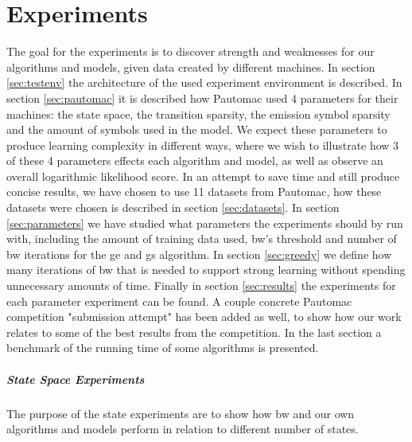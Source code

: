 \chapter{Experiments}
\label{chap:experiments}
The goal for the experiments is to discover strength and weaknesses for our algorithms and models, given data created by different machines. In section \ref{sec:testenv} the architecture of the used experiment environment is described. In section \ref{sec:pautomac} it is described how Pautomac used 4 parameters for their machines: the state space, the transition sparsity, the emission symbol sparsity and the amount of symbols used in the model. We expect these parameters to produce learning complexity in different ways, where we wish to illustrate how 3 of these 4 parameters effects each algorithm and model, as well as observe an overall logarithmic likelihood score. In an attempt to save time and still produce concise results, we have chosen to use 11 datasets from Pautomac, how these datasets were chosen is described in section \ref{sec:datasets}. In section \ref{sec:parameters} we have studied what parameters the experiments should by run with, including the amount of training data used, \gls{bw}'s threshold and number of \gls{bw} iterations for the \gls{ge} and \gls{gs} algorithm. In section \ref{sec:greedy} we define how many iterations of \gls{bw} that is needed to support strong learning without spending unnecessary amounts of time.
Finally in section \ref{sec:results} the experiments for each parameter experiment can be found. A couple concrete Pautomac competition "submission attempt" has been added as well, to show how our work relates to some of the best results from the competition. In the last section a benchmark of the running time of some algorithms is presented.







\FloatBarrier

\paragraph{State Space Experiments}

The purpose of the state experiments are to show how \gls{bw} and our own algorithms and models perform in relation to different number of states.\\

